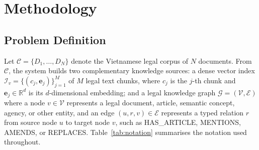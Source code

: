 \documentclass[pdflatex,sn-mathphys-num]{sn-jnl}
\begin{document}
\section{Methodology}\label{sec:methodology}

\subsection{Problem Definition}\label{subsec:problem_definition}

Let $\mathcal{C}=\{D_1,\ldots,D_N\}$ denote the Vietnamese legal corpus of
$N$ documents. From $\mathcal{C}$, the system builds two complementary
knowledge sources: a dense vector index
$\mathcal{I}_v=\{(c_j,\mathbf{e}_j)\}_{j=1}^{M}$ of $M$ legal text chunks,
where $c_j$ is the $j$-th chunk and $\mathbf{e}_j\in\mathbb{R}^d$ is its
$d$-dimensional embedding; and a legal knowledge graph
$\mathcal{G}=(\mathcal{V},\mathcal{E})$ where a node $v\in\mathcal{V}$
represents a legal document, article, semantic concept, agency, or other
entity, and an edge $(u,r,v)\in\mathcal{E}$ represents a typed relation $r$
from source node $u$ to target node $v$, such as \textsc{HAS\_ARTICLE},
\textsc{MENTIONS}, \textsc{AMENDS}, or \textsc{REPLACES}. Table~\ref{tab:notation}
summarises the notation used throughout.
\end{document}
